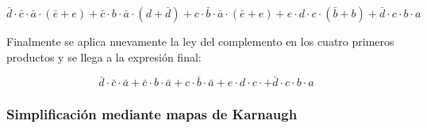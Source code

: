 \begin{equation}
\bar{d} \cdot \bar{c} \cdot \bar{a} \cdot (\bar{e} + e) + 
\bar{c} \cdot b \cdot \bar{a} \cdot (d + \bar{d}) + 
c \cdot \bar{b} \cdot \bar{a} \cdot (\bar{e} + e) + 
e \cdot d \cdot c \cdot (\bar{b} + b) +
\bar{d} \cdot c \cdot b \cdot a 
\end{equation}

Finalmente se aplica nuevamente la ley del complemento en los cuatro primeros productos y se llega a la expresión final:

\begin{equation}\label{canonica_minterm}
\boxed{\bar{d} \cdot \bar{c} \cdot \bar{a} + 
\bar{c} \cdot b \cdot \bar{a} + 
c \cdot \bar{b} \cdot \bar{a} + 
e \cdot d \cdot c \cdot + 
\bar{d} \cdot c \cdot b \cdot a}
\end{equation}


\subsubsection{Simplificación mediante mapas de Karnaugh}

